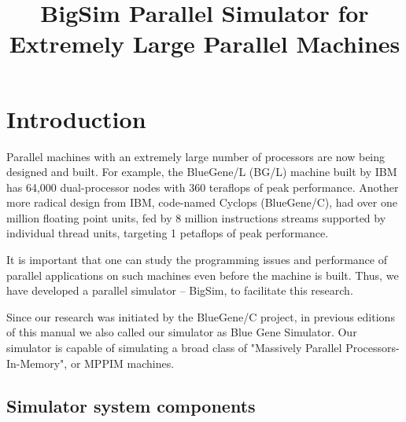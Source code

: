 \documentclass[10pt]{article}
\title{BigSim Parallel Simulator for Extremely Large Parallel Machines}
\begin{document}
\maketitle

\section{Introduction}


Parallel machines with an extremely large number of processors are now
being designed and built. For example, the BlueGene/L (BG/L) machine
built by IBM has 64,000 dual-processor nodes with 360 teraflops of
peak performance. Another more radical design from IBM,
code-named Cyclops (BlueGene/C), had over one million floating point units,
fed by 8 million instructions streams supported by individual thread units,
targeting 1 petaflops of peak performance.


It is important that one can study the programming issues and performance
of parallel applications on such machines even before the machine is built.
Thus, we have developed a parallel simulator -- BigSim, to facilitate this research.

Since our research was initiated by the BlueGene/C project, in previous editions of this manual
we also called our simulator as Blue Gene Simulator.
Our simulator is capable of simulating a broad class of "Massively Parallel
Processors-In-Memory", or MPPIM machines. 

\subsection{Simulator system components}
\end{document}
